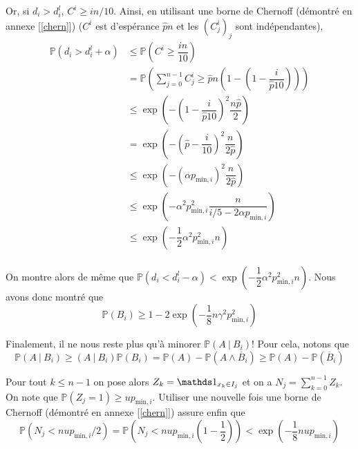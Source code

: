 Or, si \(d_i > d_i^l\), \(C^i \geq in/10\). Ainsi, en utilisant une borne de {\sc Chernoff} (démontré en annexe [\ref{chern}]) (\(C^i\) est d'espérance \(\hat pn\) et les \((C^i_j)_j\) sont indépendantes),
\begin{align*}
    \mathbb P\left( d_i > d_i^l + \alpha \right)& \leq \mathbb P \left( C^i \geq \dfrac{in}{10}\right)\\
    & = \mathbb P \left( \sum_{j = 0}^{n-1}C^i_j \geq \hat pn\left( 1 - \left(1 - \dfrac{i}{\hat p 10}\right)\right)\right)\\
    & \leq \exp\left( -\left(1 - \dfrac{i}{\hat p 10}\right)^2\dfrac{n\hat p}{2}\right)\\
    & = \exp\left( -\left(\hat p - \dfrac{i}{10}\right)^2\dfrac{n}{2\hat p}\right)\\
    & \leq \exp\left( -\left(\alpha p_{\text{min}, i}\right)^2\dfrac{n}{2\hat p}\right)\\
    & \leq \exp\left( -\alpha^2 p_{\text{min}, i}^2\dfrac{n}{i/5 - 2\alpha p_{\text{min}, i}}\right)\\
    & \leq \exp\left( -\dfrac{1}{2}\alpha^2 p_{\text{min}, i}^2n\right)\\
\end{align*}

On montre alors de même que \(\mathbb P\left( d_i < d_i^l - \alpha \right) < \exp\left( -\dfrac{1}{2}\alpha^2 p_{\text{min}, i}^2n\right)\). Nous avons donc montré que 
\[
    \mathbb P \left( B_i \right) \geq 1 - 2\exp\left( -\dfrac{1}{8}n\gamma^2 p_{\text{min}, i}^2\right)
\]

Finalement, il ne nous reste plus qu'à minorer \(\mathbb P (A\ | \ B_i)\)! Pour cela, notons que 
\[
    \mathbb P (A\ | \ B_i) \geq (A\ | \ B_i)\mathbb P(B_i) = \mathbb P (A) - \mathbb P \left( A \wedge \overline B_i \right) \geq \mathbb P (A) - \mathbb P (\overline B_i)
\]

Pour tout \(k \leq n - 1\) on pose alors \(Z_k = \un_{x_k \in I_j}\) et on a \(N_j = \sum_{k = 0}^{n-1} Z_k\). On note que \(\mathbb P (Z_j = 1) \geq u p_{\text{min}, i}\). Utiliser une nouvelle fois une borne de {\sc Chernoff} (démontré en annexe [\ref{chern}]) assure enfin que 
\[
    \mathbb P \left( N_j < n u p_{\text{min}, i}/2\right) = \mathbb P \left( N_j < n u p_{\text{min}, i} \left( 1 - \dfrac{1}{2} \right)\right) < \exp\left( - \dfrac{1}{8}n u p_{\text{min}, i} \right)
\]

